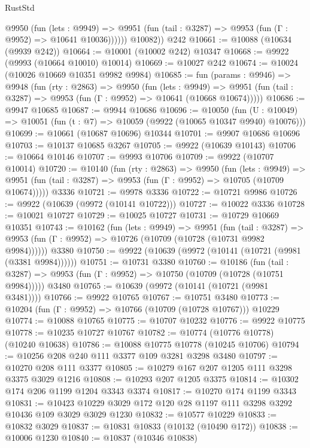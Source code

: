 \begin{lexlean}{RustStd}
\begin{coremodule}
            @9950
              (fun (lets : @9949) =>
              @9951 (fun (tail : @3287) => @9953 (fun (Γ : @9952) => @10641 @10036))))))
        @10082))
    @242
@10661 := @10088 (@10634 (@9939 @242))
@10664 := @10001 (@10002 @242) @10347
@10668 := @9922 (@9993 (@10664 @10010) @10014)
@10669 := @10027 @242
@10674 := @10024 (@10026 @10669 @10351 @9982 @9984)
@10685 := fun (params : @9946) =>
  @9948
    (fun (rty : @2863) =>
    @9950
      (fun (lets : @9949) =>
      @9951 (fun (tail : @3287) => @9953 (fun (Γ : @9952) => @10641 (@10668 @10674)))))
@10686 := @9947 @10685
@10687 := @9944 @10686
@10696 := @10050
    (fun (U : @10049) => @10051 (fun (t : @7) => @10059 (@9922 (@10065 @10347 @9940) @10076)))
@10699 := @10661 (@10687 @10696) @10344
@10701 := @9907 @10686 @10696
@10703 := @10137 @10685 @3267
@10705 := @9922 (@10639 @10143)
@10706 := @10664 @10146
@10707 := @9993 @10706
@10709 := @9922 (@10707 @10014)
@10720 := @10140
    (fun (rty : @2863) =>
    @9950
      (fun (lets : @9949) =>
      @9951 (fun (tail : @3287) => @9953 (fun (Γ : @9952) => @10705 (@10709 @10674)))))
    @3336
@10721 := @9978 @3336
@10722 := @10721 @9986
@10726 := @9922 (@10639 (@9972 (@10141 @10722)))
@10727 := @10022 @3336
@10728 := @10021 @10727
@10729 := @10025 @10727
@10731 := @10729 @10669 @10351
@10743 := @10162
    (fun (lets : @9949) =>
    @9951
      (fun (tail : @3287) =>
      @9953 (fun (Γ : @9952) => @10726 (@10709 (@10728 (@10731 @9982 @9984))))))
    @3380
@10750 := @9922 (@10639 (@9972 (@10141 (@10721 (@9981 (@3381 @9984))))))
@10751 := @10731 @3380
@10760 := @10186
    (fun (tail : @3287) => @9953 (fun (Γ : @9952) => @10750 (@10709 (@10728 (@10751 @9984)))))
    @3480
@10765 := @10639 (@9972 (@10141 (@10721 (@9981 @3481))))
@10766 := @9922 @10765
@10767 := @10751 @3480
@10773 := @10204 (fun (Γ : @9952) => @10766 (@10709 (@10728 @10767))) @10229
@10774 := @10088 @10765
@10775 := @10707 @10232
@10776 := @9922 @10775
@10778 := @10235 @10727 @10767
@10782 := @10774 (@10776 @10778) (@10240 @10638)
@10786 := @10088 @10775 @10778 (@10245 @10706)
@10794 := @10256 @208 @240 @111 @3377 @109 @3281 @3298 @3480
@10797 := @10270 @208 @111 @3377
@10805 := @10279 @167 @207 @1205 @111 @3298 @3375 @3029 @1216
@10808 := @10293 @207 @1205 @3375
@10814 := @10302 @174 @206 @1199 @1204 @3343 @3374
@10817 := @10270 @174 @1199 @3343
@10831 := @10423 @10229 @3029 @172 @120 @28 @1197 @111 @3298 @3292 @10436 @109 @3029 @3029 @1230
@10832 := @10577 @10229
@10833 := @10832 @3029
@10837 := @10831 @10833 (@10132 (@10490 @172))
@10838 := @10006 @1230
@10840 := @10837 (@10346 @10838)

\end{coremodule}
\end{lexlean}
